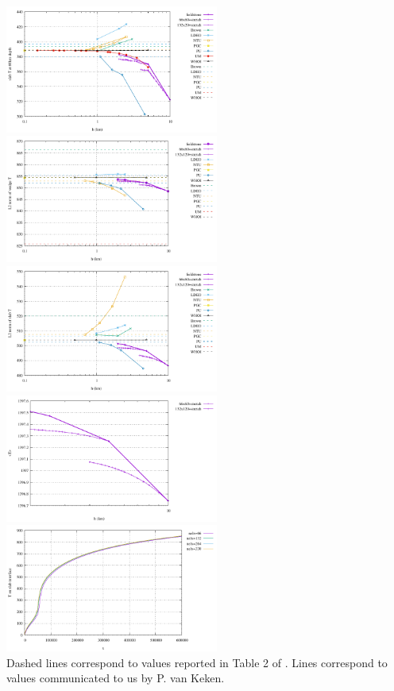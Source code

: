 \begin{center}
\includegraphics[width=7cm]{python_codes/fieldstone_68/results/case1a/Tcorner}
\includegraphics[width=7cm]{python_codes/fieldstone_68/results/case1a/Twedge}\\
\includegraphics[width=7cm]{python_codes/fieldstone_68/results/case1a/Tslab}
\includegraphics[width=7cm]{python_codes/fieldstone_68/results/case1a/Tavrg}\\
\includegraphics[width=7cm]{python_codes/fieldstone_68/results/case1a/tempdiag}\\
{\captionfont Dashed lines correspond to values reported in Table 2 of \cite{vack08}.
Lines correspond to values communicated to us by P. van Keken.}
\end{center}

